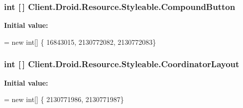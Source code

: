 \subsubsection[{Compound\+Button}]{\setlength{\rightskip}{0pt plus 5cm}int \mbox{[}$\,$\mbox{]} Client.\+Droid.\+Resource.\+Styleable.\+Compound\+Button\hspace{0.3cm}{\ttfamily [static]}}\label{classClient_1_1Droid_1_1Resource_1_1Styleable_a7520d0723a03b2f549da9b8868063e2d}
{\bfseries Initial value\+:}
\begin{DoxyCode}
= \textcolor{keyword}{new} \textcolor{keywordtype}{int}[]
            \{
                    16843015,
                    2130772082,
                    2130772083\}
\end{DoxyCode}
\hypertarget{classClient_1_1Droid_1_1Resource_1_1Styleable_aa5589321c60f009be185fd6637021d58}{}
\subsubsection[{Coordinator\+Layout}]{\setlength{\rightskip}{0pt plus 5cm}int \mbox{[}$\,$\mbox{]} Client.\+Droid.\+Resource.\+Styleable.\+Coordinator\+Layout\hspace{0.3cm}{\ttfamily [static]}}\label{classClient_1_1Droid_1_1Resource_1_1Styleable_aa5589321c60f009be185fd6637021d58}
{\bfseries Initial value\+:}
\begin{DoxyCode}
= \textcolor{keyword}{new} \textcolor{keywordtype}{int}[]
            \{
                    2130771986,
                    2130771987\}
\end{DoxyCode}
\hypertarget{classClient_1_1Droid_1_1Resource_1_1Styleable_a40093e0639053736adca43c4abe2c339}{}
